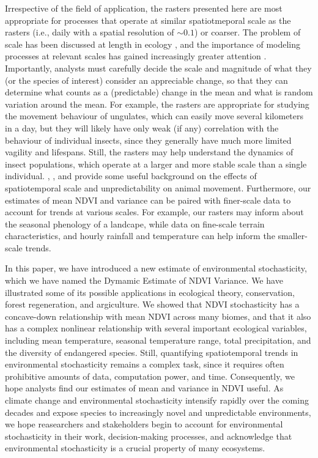\documentclass{article}
\begin{document}
Irrespective of the field of application, the rasters presented here are most appropriate for processes that operate at similar spatiotmeporal scale as the rasters (i.e., daily with a spatial resolution of \(\sim 0.1\)) or coarser. The problem of scale has been discussed at length in ecology \citep{levin_problem_1992, frankham_importance_2004}, and the importance of modeling processes at relevant scales has gained increasingly greater attention \citep{bro-jorgensen_using_2008, nathan_big-data_2022, goodchild_scale_2023, pease_ecological_2024}. Importantly, analysts must carefully decide the scale and magnitude of what they (or the species of interest) consider an appreciable change, so that they can determine what counts as a (predictable) change in the mean and what is random variation around the mean. For example, the rasters are appropriate for studying the movement behaviour of ungulates, which can easily move several kilometers in a day, but they will likely have only weak (if any) correlation with the behaviour of individual insects, since they generally have much more limited vagility and lifespans. Still, the rasters may help understand the dynamics of insect populations, which operate at a larger and more stable scale than a single individual. \citet{riotte-lambert_environmental_2020}, \citet{mezzini_how_2025}, and \citet{oestreich_resource_2026} provide some useful background on the effects of spatiotemporal scale and unpredictability on animal movement. Furthermore, our estimates of mean NDVI and variance can be paired with finer-scale data to account for trends at various scales. For example, our rasters may inform about the seasonal phenology of a landcape, while data on fine-scale terrain characteristics, and hourly rainfall and temperature can help inform the smaller-scale trends.

In this paper, we have introduced a new estimate of environmental stochasticity, which we have named the Dymamic Estimate of NDVI Variance. We have illustrated some of its possible applications in ecological theory, conservation, forest regeneration, and argiculture. We showed that NDVI stochasticity has a concave-down relationship with mean NDVI across many biomes, and that it also has a complex nonlinear relationship with several important ecological variables, including mean temperature, seasonal temperature range, total precipitation, and the diversity of endangered species. Still, quantifying spatiotemporal trends in environmental stochasticity remains a complex task, since it requires often prohibitive amounts of data, computation power, and time. Consequently, we hope analysts find our estimates of mean and variance in NDVI useful. As climate change and environmental stochasticity intensify rapidly over the coming decades and expose species to increasingly novel and unpredictable environments, we hope reasearchers and stakeholders begin to account for environmental stochasticity in their work, decision-making processes, and acknowledge that environmental stochasticity is a crucial property of many ecosystems.
\end{document}
